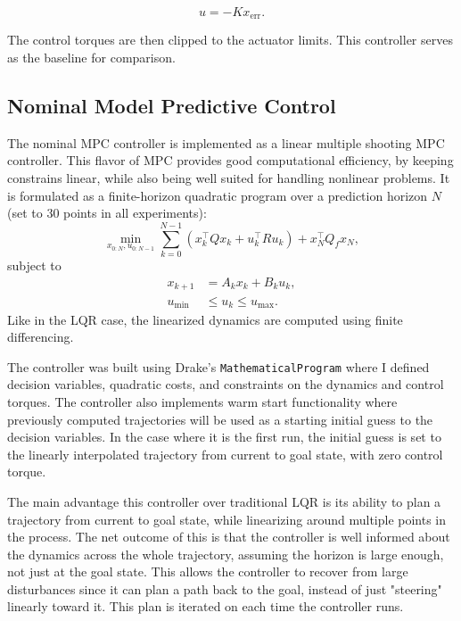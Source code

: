 \documentclass[conference]{IEEEtran}
\begin{document}
\begin{equation}
u = -Kx_{\text{err}}.
\end{equation}

The control torques are then clipped to the actuator limits.
This controller serves as the baseline for comparison.


\subsection{Nominal Model Predictive Control}
The nominal MPC controller is implemented as a linear multiple shooting MPC 
controller. This flavor of MPC provides good computational efficiency, by keeping constrains linear,
while also being well suited for handling nonlinear problems. 
It is formulated as a finite-horizon quadratic program over a
prediction horizon \(N\) (set to 30 points in all experiments):
\begin{equation}
\min_{x_{0:N}, u_{0:N-1}} 
\sum_{k=0}^{N-1} (x_k^\top Q x_k + u_k^\top R u_k)
+ x_N^\top Q_f x_N,
\end{equation}
subject to
\begin{align}
x_{k+1} &= A_k x_k + B_k u_k, \\
u_{\min} &\le u_k \le u_{\max}.
\end{align}
Like in the LQR case, the linearized dynamics are computed using finite differencing.

The controller was built using Drake's \texttt{MathematicalProgram}
where I defined decision variables, quadratic costs, and constraints on the 
dynamics and control torques. The controller also implements warm start 
functionality where previously computed trajectories will be used as a starting 
initial guess to the decision variables. In the case where it is the first run, 
the initial guess is set to the linearly interpolated trajectory from current to goal
state, with zero control torque. 

The main advantage this controller over traditional LQR is its ability to 
plan a trajectory from current to goal state, while linearizing around multiple 
points in the process. The net outcome of this is that the controller is well 
informed about the dynamics across the whole trajectory, assuming the horizon
is large enough, not just at the goal state.
This allows the controller to recover from large disturbances since it can plan
a path back to the goal, instead of just "steering" linearly toward it.
This plan is iterated on each time the controller runs. 
\end{document}
